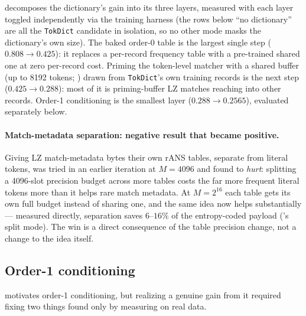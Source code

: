 \documentclass[10pt,twocolumn]{article}
\theoremstyle{plain}
\theoremstyle{definition}
\begin{document}
 decomposes the dictionary's gain into its three layers,
measured with each layer toggled independently via the training harness (the rows
below ``no dictionary'' are all the \texttt{TokDict} candidate in isolation, so no
other mode masks the dictionary's own size). The baked order-0 table is the largest
single step ($0.808 \to 0.425$): it replaces a per-record frequency table with a
pre-trained shared one at zero per-record cost. Priming the token-level matcher with
a shared buffer (up to 8192 tokens; ) drawn from
\texttt{TokDict}'s own training records is the next step ($0.425 \to 0.288$): most of
it is priming-buffer LZ matches reaching into other records. Order-1 conditioning is
the smallest layer ($0.288 \to 0.2565$), evaluated separately below.

\paragraph{Match-metadata separation: negative result that became positive.} Giving
LZ match-metadata bytes their own rANS tables, separate from literal tokens, was
tried in an earlier iteration at $M=4096$ and found to \emph{hurt}: splitting a
4096-slot precision budget across more tables costs the far more frequent literal
tokens more than it helps rare match metadata. At $M=2^{16}$ each table gets its own
full budget instead of sharing one, and the same idea now helps substantially ---
measured directly, separation saves $6$--$16\%$ of the entropy-coded payload
('s split mode). The win is a direct consequence of the table
precision change, not a change to the idea itself.

\subsection{Order-1 conditioning}\label{sec:order1}

 motivates order-1 conditioning, but realizing a genuine gain from it
required fixing two things found only by measuring on real data.
\end{document}
